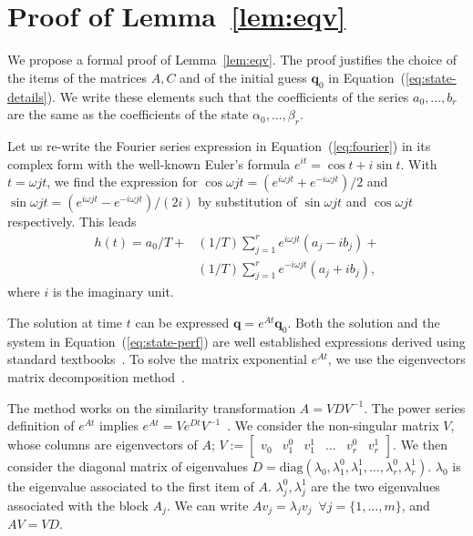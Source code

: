 \documentclass[letterpaper,10pt,conference]{ieeeconf}
\theoremstyle{definition}
\begin{document}
\leavevmode\thispagestyle{empty}\newpage
\leavevmode\thispagestyle{empty}\newpage

\appendices

\section{Proof of Lemma~\ref{lem:eqv}}
\label{app:proof-eqv}

We propose a formal proof of Lemma~\ref{lem:eqv}. The proof justifies the choice of the items of the matrices $A,C$ and of the initial guess $\mathbf{q}_0$ in Equation~(\ref{eq:state-details}). We write these elements such that the coefficients of the series $a_0,\dots,b_r$ are the same as the coefficients of the state $\alpha_0,\dots,\beta_r$.

Let us re-write the Fourier series expression in Equation~(\ref{eq:fourier}) in its complex form with the well-known Euler's formula $e^{it}=\cos{t}+i\sin{t}$. With $t=\omega jt$, we find the expression for $\cos{\omega jt}=(e^{i\omega jt}+e^{-i\omega jt})/2$ and $\sin{\omega jt}=(e^{i\omega jt}-e^{-i\omega jt})/(2i)$ by substitution of $\sin{\omega jt}$ and $\cos{\omega jt}$ respectively. This leads~\cite{kuo1967automatic}
\begin{equation}\begin{split}\label{eq:proof-complex}
  h(t)=a_0/T+&(1/T)\sum_{j=1}^{r}{e^{i\omega jt}(a_j-ib_j)}+\\&(1/T)\sum_{j=1}^{r}{e^{-i\omega jt}(a_j+ib_j)},
 \end{split}\end{equation}
where $i$ is the imaginary unit. 

The solution at time $t$ can be expressed $\mathbf{q}=e^{At}\mathbf{q}_0$. Both the solution and the system in Equation~(\ref{eq:state-perf}) are well established expressions derived using standard textbooks~\cite{kuo1967automatic, ogata2002modern}. To solve the matrix exponential $e^{At}$, we use the eigenvectors matrix decomposition method~\cite{moler2003nineteen}.

The method works on the similarity transformation $A=VDV^{-1}$. The power series definition of $e^{At}$ implies $e^{At}=Ve^{Dt}V^{-1}$~\cite{moler2003nineteen}. We consider the non-singular matrix $V$, whose columns are eigenvectors of $A$; $V:=\begin{bmatrix}v_0 & v_1^0 & v_1^1 & \dots & v_r^0 & v_r^1\end{bmatrix}$. We then consider the diagonal matrix of eigenvalues $D=\mathrm{diag}{(\lambda_0,\lambda_1^0,\lambda_1^1,\dots,\lambda_r^0,\lambda_r^1)}$. $\lambda_0$ is the eigenvalue associated to the first item of $A$. $\lambda_j^0,\lambda_j^1$ are the two eigenvalues associated with the block $A_j$. We can write $Av_j=\lambda_jv_j\,\,\,\forall j=\{1,\dots,m\}$, and $AV=VD$. 
\end{document}
